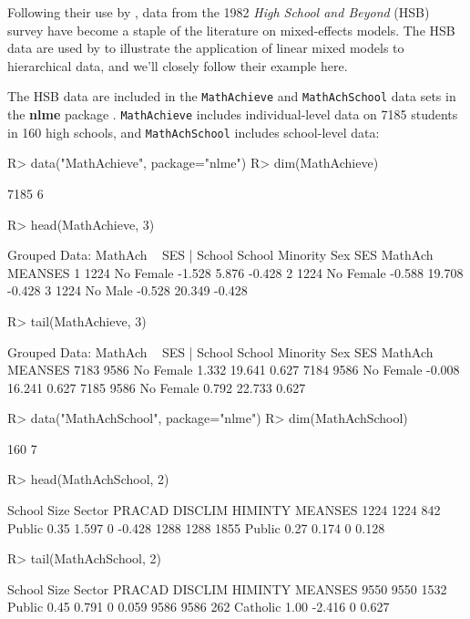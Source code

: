 \documentclass[
]{jss}
\begin{document}
Following their use by \citet{RaudenbushBryk:2002}, data from the 1982
\emph{High School and Beyond} (HSB) survey have become a staple of the
literature on mixed-effects models. The HSB data are used by \citet[Sec.
7.2.2]{FoxWeisberg:2019} to illustrate the application of linear mixed
models to hierarchical data, and we'll closely follow their example
here.

The HSB data are included in the \texttt{MathAchieve} and
\texttt{MathAchSchool} data sets in the \textbf{nlme} package
\citep{PinheiroBates:2000}. \texttt{MathAchieve} includes
individual-level data on 7185 students in 160 high schools, and
\texttt{MathAchSchool} includes school-level data:

\begin{CodeChunk}
\begin{CodeInput}
R> data("MathAchieve", package="nlme")
R> dim(MathAchieve)
\end{CodeInput}
\begin{CodeOutput}
[1] 7185    6
\end{CodeOutput}
\begin{CodeInput}
R> head(MathAchieve, 3)
\end{CodeInput}
\begin{CodeOutput}
Grouped Data: MathAch ~ SES | School
  School Minority    Sex    SES MathAch MEANSES
1   1224       No Female -1.528   5.876  -0.428
2   1224       No Female -0.588  19.708  -0.428
3   1224       No   Male -0.528  20.349  -0.428
\end{CodeOutput}
\begin{CodeInput}
R> tail(MathAchieve, 3)
\end{CodeInput}
\begin{CodeOutput}
Grouped Data: MathAch ~ SES | School
     School Minority    Sex    SES MathAch MEANSES
7183   9586       No Female  1.332  19.641   0.627
7184   9586       No Female -0.008  16.241   0.627
7185   9586       No Female  0.792  22.733   0.627
\end{CodeOutput}
\begin{CodeInput}
R> data("MathAchSchool", package="nlme")
R> dim(MathAchSchool)
\end{CodeInput}
\begin{CodeOutput}
[1] 160   7
\end{CodeOutput}
\begin{CodeInput}
R> head(MathAchSchool, 2)
\end{CodeInput}
\begin{CodeOutput}
     School Size Sector PRACAD DISCLIM HIMINTY MEANSES
1224   1224  842 Public   0.35   1.597       0  -0.428
1288   1288 1855 Public   0.27   0.174       0   0.128
\end{CodeOutput}
\begin{CodeInput}
R> tail(MathAchSchool, 2)
\end{CodeInput}
\begin{CodeOutput}
     School Size   Sector PRACAD DISCLIM HIMINTY MEANSES
9550   9550 1532   Public   0.45   0.791       0   0.059
9586   9586  262 Catholic   1.00  -2.416       0   0.627
\end{CodeOutput}
\end{CodeChunk}
\end{document}
